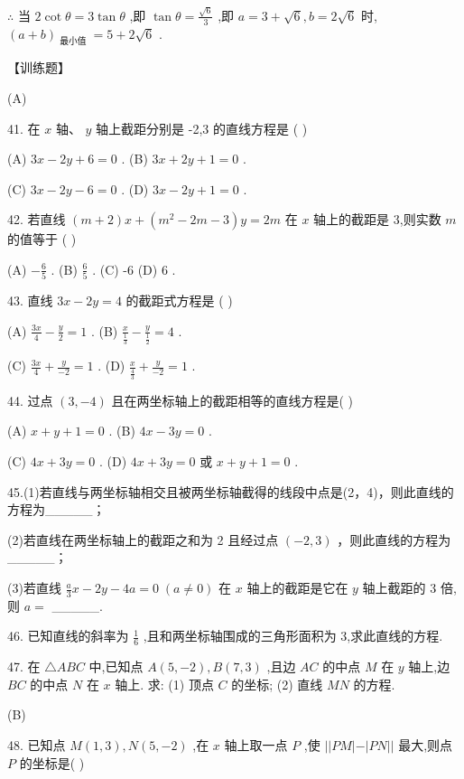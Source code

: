 \documentclass[10pt]{article}
\begin{document}
\(\therefore\) 当 \(2\cot \theta  = 3\tan \theta\) ,即 \(\tan \theta  = \frac{\sqrt{6}}{3}\) ,即 \(a = 3 + \sqrt{6},b = 2\sqrt{6}\) 时, \({\left( a + b\right) }_{\text{ 最小值 }} = 5 + 2\sqrt{6}\) .

【训练题】

(A)

41. 在 \(x\) 轴、 \(y\) 轴上截距分别是 -2,3 的直线方程是 ( )

(A) \({3x} - {2y} + 6 = 0\) . (B) \({3x} + {2y} + 1 = 0\) .

(C) \({3x} - {2y} - 6 = 0\) . (D) \({3x} - {2y} + 1 = 0\) .

42. 若直线 \(\left( {m + 2}\right) x + \left( {{m}^{2} - {2m} - 3}\right) y = {2m}\) 在 \(x\) 轴上的截距是 3,则实数 \(m\) 的值等于 ( )

(A) \(- \frac{6}{5}\) . (B) \(\frac{6}{5}\) . (C) -6 (D) 6 .

43. 直线 \({3x} - {2y} = 4\) 的截距式方程是 ( )

(A) \(\frac{3x}{4} - \frac{y}{2} = 1\) . (B) \(\frac{x}{\frac{1}{3}} - \frac{y}{\frac{1}{2}} = 4\) .

(C) \(\frac{3x}{4} + \frac{y}{-2} = 1\) . (D) \(\frac{x}{\frac{4}{3}} + \frac{y}{-2} = 1\) .

44. 过点 \(\left( {3, - 4}\right)\) 且在两坐标轴上的截距相等的直线方程是( )

(A) \(x + y + 1 = 0\) . (B) \({4x} - {3y} = 0\) .

(C) \({4x} + {3y} = 0\) . (D) \({4x} + {3y} = 0\) 或 \(x + y + 1 = 0\) .

45.(1)若直线与两坐标轴相交且被两坐标轴截得的线段中点是(2，4)，则此直线的方程为\_\_\_\_\_；

(2)若直线在两坐标轴上的截距之和为 2 且经过点 \(\left( {-2,3}\right)\) ，则此直线的方程为\_\_\_\_\_；

(3)若直线 \(\frac{a}{3}x - {2y} - {4a} = 0\;\left( {a \neq  0}\right)\) 在 \(x\) 轴上的截距是它在 \(y\) 轴上截距的 3 倍,则 \(a =\) \_\_\_\_\_.

46. 已知直线的斜率为 \(\frac{1}{6}\) ,且和两坐标轴围成的三角形面积为 3,求此直线的方程.

47. 在 \(\bigtriangleup {ABC}\) 中,已知点 \(A\left( {5, - 2}\right) ,B\left( {7,3}\right)\) ,且边 \({AC}\) 的中点 \(M\) 在 \(y\) 轴上,边 \({BC}\) 的中点 \(N\) 在 \(x\) 轴上. 求: (1) 顶点 \(C\) 的坐标; (2) 直线 \({MN}\) 的方程.

(B)

48. 已知点 \(M\left( {1,3}\right) ,N\left( {5, - 2}\right)\) ,在 \(x\) 轴上取一点 \(P\) ,使 \(\left| \right| {PM}\left| -\right| {PN}\left| \right|\) 最大,则点 \(P\) 的坐标是( )
\end{document}
